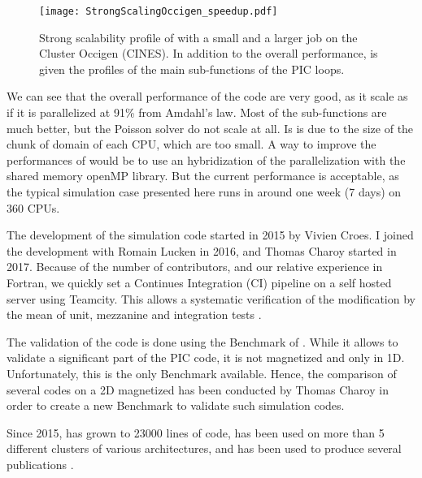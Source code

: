 \begin{figure}[hbtp]
  \centering
  \texttt{[image: StrongScalingOccigen\_speedup.pdf]}
  \caption{Strong scalability profile of \LPPic with a small and a larger job on the Cluster Occigen (CINES). In addition to the overall performance, is given the profiles of the main sub-functions of the \ac{PIC} loops. }
  \label{fig-strongperfo}
\end{figure}

We can see that the overall performance of the code are very good, as it scale as if it is parallelized at 91\% from Amdahl's law.
Most of the sub-functions are much better, but the Poisson solver do not scale at all.
Is is due to the size of the chunk of domain of each CPU, which are too small.
A way to improve the performances of \LPPic would be to use an hybridization of the parallelization with the shared memory openMP library.
But the current performance is acceptable, as the typical simulation case presented here runs in around one week (7 days) on 360 CPUs.

\vspace{1em}

The development of the  simulation code \LPPic started in 2015 by Vivien Croes.
I joined the development with Romain Lucken in 2016, and Thomas Charoy started in 2017.
Because of the number of contributors, and our relative experience in Fortran, we quickly set a Continues Integration (CI) pipeline on a self hosted server using Teamcity.
This allows a systematic verification of the modification by the mean of unit, mezzanine and integration tests \citep{turner2016}.

The validation of the code is done using the Benchmark of \citet{turner2013}.
While it allows to validate a significant part of the \ac{PIC} code, it is not magnetized and only in \ac{1D}.
Unfortunately, this is the only Benchmark available.
Hence, the comparison of several codes on a \ac{2D} magnetized  has been conducted by Thomas Charoy in order to create a new Benchmark to validate such simulation codes.


Since 2015, \LPPic has grown to 23000 lines of code, has been used on more than 5 different clusters of various architectures, and has been used to produce several publications \citep{croes2017a,croes2018,tavant2018,tavant2019,lucken2018,lucken2019}.
